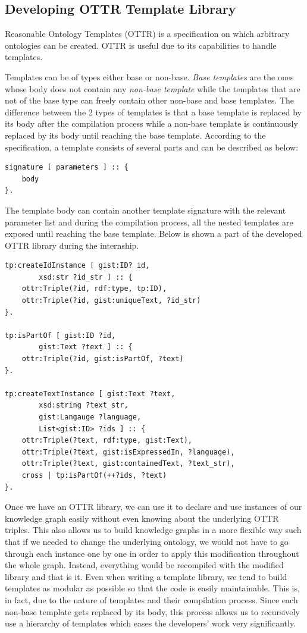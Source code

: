 \subsection{Developing OTTR Template Library}

Reasonable Ontology Templates (OTTR) is a specification on which arbitrary ontologies can be created. 
OTTR is useful due to its capabilities to handle templates. 

Templates can be of types either base or non-base. \textit{Base templates} are the ones whose body 
does not contain any \textit{non-base template} while the templates that are not of the base type 
can freely 
contain other non-base and base templates. The difference between the 2 types of templates is that 
a base template is replaced by its body after the compilation process while a non-base template is 
continuously replaced by its body until reaching the base template. According to the specification, a 
template consists of several parts and can be described as below:

\begin{lstlisting}
signature [ parameters ] :: {
	body
}.
\end{lstlisting}

The template body can contain another template signature with the relevant parameter list and during 
the compilation process, all the nested templates are exposed until reaching the base template. 
Below is shown a part of the developed OTTR library during the internship.

\begin{lstlisting}
tp:createIdInstance [ gist:ID? id, 
		xsd:str ?id_str ] :: {
	ottr:Triple(?id, rdf:type, tp:ID),
	ottr:Triple(?id, gist:uniqueText, ?id_str)
}.

tp:isPartOf [ gist:ID ?id, 
		gist:Text ?text ] :: {
	ottr:Triple(?id, gist:isPartOf, ?text)
}.

tp:createTextInstance [ gist:Text ?text, 
		xsd:string ?text_str, 
		gist:Langauge ?language, 
		List<gist:ID> ?ids ] :: {
	ottr:Triple(?text, rdf:type, gist:Text),
	ottr:Triple(?text, gist:isExpressedIn, ?language),
	ottr:Triple(?text, gist:containedText, ?text_str),
	cross | tp:isPartOf(++?ids, ?text)
}.
\end{lstlisting}

Once we have an OTTR library, we can use it to declare and use instances of our knowledge graph easily 
without even knowing about the underlying OTTR triples. This also allows us to build knowledge graphs 
in a more flexible way such that if we needed to change the underlying ontology, we would not have to 
go through each instance one by one in order to apply this modification throughout the whole graph. 
Instead, everything would be recompiled with the modified library and that is it. Even when writing a 
template library, we tend to build templates as modular as possible so that the code is easily 
maintainable. This is, in fact, due to the nature of templates and their compilation process. Since 
each non-base template gets replaced by its body, this process allows us to recursively use a 
hierarchy 
of templates which eases the developers' work very significantly.

